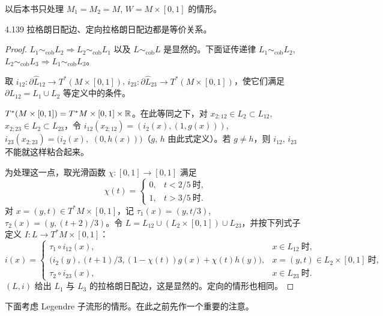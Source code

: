 
以后本书只处理 $M_1=M_2=M$, $W=M\times[0,1]$ 的情形。

\begin{lemma*}{4.139}
  拉格朗日配边、定向拉格朗日配边都是等价关系。
\end{lemma*}

\begin{proof}
  $L_1\sim_{\mathrm{cob}}L_2\Rightarrow L_2\sim_{\mathrm{cob}}L_1$ 以及 $L\sim_{\mathrm{cob}}L$ 是显然的。下面证传递律 $L_1\sim_{\mathrm{cob}}L_2$, $L_2\sim_{\mathrm{cob}}L_3\Rightarrow L_1\sim_{\mathrm{cob}}L_3$。

  取 $i_{12}\colon\partial\hat L_{12}\to T^*(M\times[0,1])$, $i_{23}\colon\partial\hat L_{23}\to T^*(M\times[0,1])$，使它们满足 $\partial L_{12}=L_1\cup L_2$ 等定义中的条件。

  $T^*(M\times[0,1])=T^*M\times[0,1]\times\mathbb{R}$。在此等同之下，对 $x_{2;12}\in L_2\subset L_{12}$, $x_{2;23}\in L_2\subset L_{23}$，令 $i_{12}(x_{2;12})=(i_2(x),(1,g(x)))$, $i_{23}(x_{2;23})=(i_2(x),$ $(0,h(x)))$（$g$, $h$ 由此式定义）。若 $g\neq h$，则 $i_{12}$, $i_{23}$ 不能就这样粘合起来。

  为处理这一点，取光滑函数 $\chi\colon[0,1]\to[0,1]$ 满足
  \[
    \chi(t)=
    \begin{cases}
      0, & t<2/5\ \text{时},\\
      1, & t>3/5\ \text{时}.
    \end{cases}
  \]
  对 $x=(y,t)\in T^*M\times[0,1]$，记 $\tau_1(x)=(y,t/3)$, $\tau_2(x)=(y,(t+2)/3)$。令 $L=L_{12}\cup(L_2\times[0,1])\cup L_{23}$，并按下列式子定义 $I\colon L\to T^*M\times[0,1]$：
  \[
    i(x)=
    \begin{cases}
      \tau_1\circ i_{12}(x), & x\in L_{12}\ \text{时},\\
      \bigl(i_2(y),(t+1)/3,(1-\chi(t))g(x)+\chi(t)h(y)\bigr), & x=(y,t)\in L_2\times[0,1]\ \text{时},\\
      \tau_2\circ i_{23}(x), & x\in L_{23}\ \text{时}.
    \end{cases}
  \]
  $(L,i)$ 给出 $L_1$ 与 $L_3$ 的拉格朗日配边，这是显然的。定向的情形也相同。
\end{proof}

下面考虑 Legendre 子流形的情形。在此之前先作一个重要的注意。

